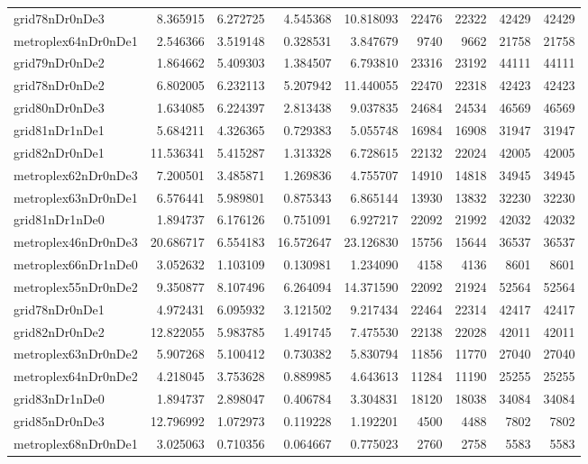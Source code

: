 \begin{longtable}{|l|r|r|r|r|r|r|r|r|}
grid78nDr0nDe3 & 8.365915 & 6.272725 & 4.545368 & 10.818093 & 22476 & 22322 & 42429 & 42429 \\
metroplex64nDr0nDe1 & 2.546366 & 3.519148 & 0.328531 & 3.847679 & 9740 & 9662 & 21758 & 21758 \\
grid79nDr0nDe2 & 1.864662 & 5.409303 & 1.384507 & 6.793810 & 23316 & 23192 & 44111 & 44111 \\
grid78nDr0nDe2 & 6.802005 & 6.232113 & 5.207942 & 11.440055 & 22470 & 22318 & 42423 & 42423 \\
grid80nDr0nDe3 & 1.634085 & 6.224397 & 2.813438 & 9.037835 & 24684 & 24534 & 46569 & 46569 \\
grid81nDr1nDe1 & 5.684211 & 4.326365 & 0.729383 & 5.055748 & 16984 & 16908 & 31947 & 31947 \\
grid82nDr0nDe1 & 11.536341 & 5.415287 & 1.313328 & 6.728615 & 22132 & 22024 & 42005 & 42005 \\
metroplex62nDr0nDe3 & 7.200501 & 3.485871 & 1.269836 & 4.755707 & 14910 & 14818 & 34945 & 34945 \\
metroplex63nDr0nDe1 & 6.576441 & 5.989801 & 0.875343 & 6.865144 & 13930 & 13832 & 32230 & 32230 \\
grid81nDr1nDe0 & 1.894737 & 6.176126 & 0.751091 & 6.927217 & 22092 & 21992 & 42032 & 42032 \\
metroplex46nDr0nDe3 & 20.686717 & 6.554183 & 16.572647 & 23.126830 & 15756 & 15644 & 36537 & 36537 \\
metroplex66nDr1nDe0 & 3.052632 & 1.103109 & 0.130981 & 1.234090 & 4158 & 4136 & 8601 & 8601 \\
metroplex55nDr0nDe2 & 9.350877 & 8.107496 & 6.264094 & 14.371590 & 22092 & 21924 & 52564 & 52564 \\
grid78nDr0nDe1 & 4.972431 & 6.095932 & 3.121502 & 9.217434 & 22464 & 22314 & 42417 & 42417 \\
grid82nDr0nDe2 & 12.822055 & 5.983785 & 1.491745 & 7.475530 & 22138 & 22028 & 42011 & 42011 \\
metroplex63nDr0nDe2 & 5.907268 & 5.100412 & 0.730382 & 5.830794 & 11856 & 11770 & 27040 & 27040 \\
metroplex64nDr0nDe2 & 4.218045 & 3.753628 & 0.889985 & 4.643613 & 11284 & 11190 & 25255 & 25255 \\
grid83nDr1nDe0 & 1.894737 & 2.898047 & 0.406784 & 3.304831 & 18120 & 18038 & 34084 & 34084 \\
grid85nDr0nDe3 & 12.796992 & 1.072973 & 0.119228 & 1.192201 & 4500 & 4488 & 7802 & 7802 \\
metroplex68nDr0nDe1 & 3.025063 & 0.710356 & 0.064667 & 0.775023 & 2760 & 2758 & 5583 & 5583 \\

\end{longtable}
